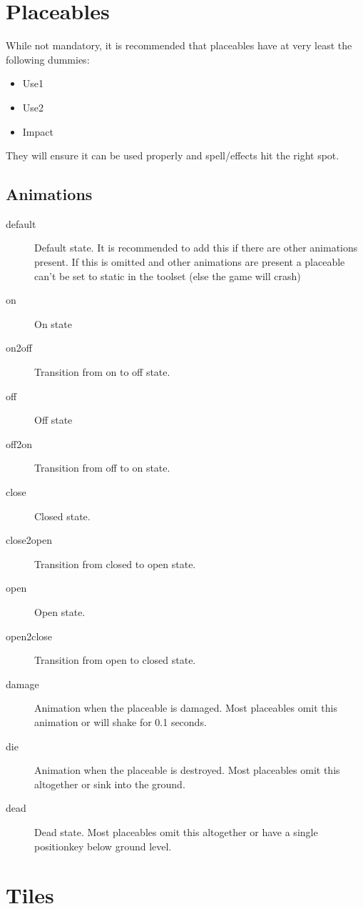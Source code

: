 \section{Placeables}
While not mandatory, it is recommended that placeables have at very least the
following dummies:
\begin{itemize}
	\item Use1
	\item Use2
	\item Impact
\end{itemize}
They will ensure it can be used properly and spell/effects hit the right spot.

\subsection*{Animations}
\begin{description}
    \item[default] Default state. It is recommended to add this if there are other animations present. If this is omitted and other animations are present a placeable can't be set to static in the toolset (else the game will crash)
    \item[on] On state
    \item[on2off] Transition from on to off state.
    \item[off] Off state
    \item[off2on] Transition from off to on state.
    \item[close] Closed state.
    \item[close2open] Transition from closed to open state.
    \item[open] Open state.
    \item[open2close] Transition from open to closed state.
    \item[damage] Animation when the placeable is damaged. Most placeables omit this animation or will shake for 0.1 seconds.
    \item[die] Animation when the placeable is destroyed. Most placeables omit this altogether or sink into the ground.
    \item[dead] Dead state. Most placeables omit this altogether or have a single positionkey below ground level.
\end{description}

\section{Tiles}

